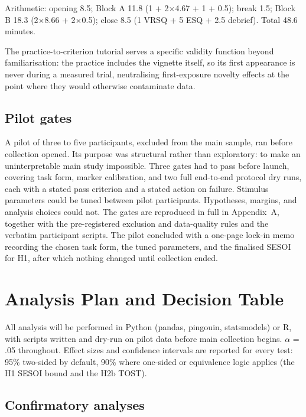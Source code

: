 Arithmetic: opening 8.5; Block A 11.8 (1 + 2$\times$4.67 + 1 + 0.5); break 1.5; Block B 18.3
(2$\times$8.66 + 2$\times$0.5); close 8.5 (1 VRSQ + 5 ESQ + 2.5 debrief). Total 48.6 minutes.

The practice-to-criterion tutorial serves a specific validity function beyond familiarisation: the
practice includes the vignette itself, so its first appearance is never during a measured trial,
neutralising first-exposure novelty effects at the point where they would otherwise contaminate data.

\subsection{Pilot gates}

A pilot of three to five participants, excluded from the main sample, ran before collection opened.
Its purpose was structural rather than exploratory: to make an uninterpretable main study impossible.
Three gates had to pass before launch, covering task form, marker calibration, and two full
end-to-end protocol dry runs, each with a stated pass criterion and a stated action on failure.
Stimulus parameters could be tuned between pilot participants. Hypotheses, margins, and analysis
choices could not. The gates are reproduced in full in Appendix~A, together with the pre-registered
exclusion and data-quality rules and the verbatim participant scripts. The pilot concluded with a
one-page lock-in memo recording the chosen task form, the tuned parameters, and the finalised SESOI
for H1, after which nothing changed until collection ended.

\section{Analysis Plan and Decision Table}

All analysis will be performed in Python (pandas, pingouin, statsmodels) or R, with scripts written
and dry-run on pilot data before main collection begins. $\alpha$ = .05 throughout. Effect sizes and
confidence intervals are reported for every test: 95\% two-sided by default, 90\% where one-sided or
equivalence logic applies (the H1 SESOI bound and the H2b TOST).

\subsection{Confirmatory analyses}

